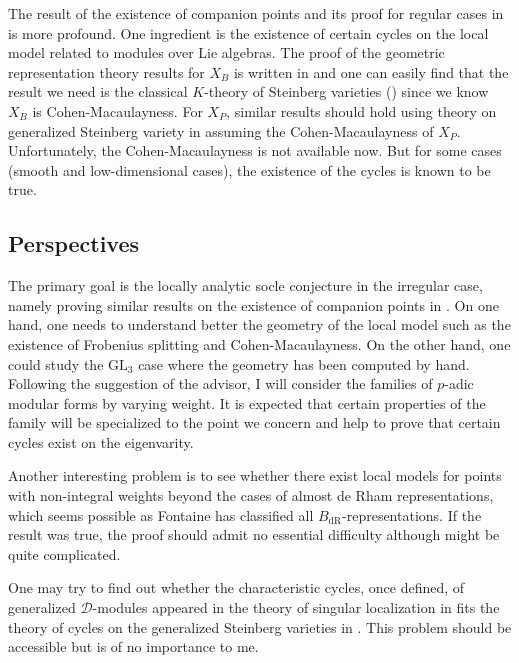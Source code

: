 \documentclass{amsart}
\newcommand{\GL}{\text{GL}}
\numberwithin{equation}{section}
\begin{document}
The result of the existence of companion points and its proof for regular cases in \cite{breuil2019local} is more profound. One ingredient is the existence of certain cycles on the local model related to modules over Lie algebras. The proof of the geometric representation theory results for $X_B$ is written in \cite{riche2008geometric} and one can easily find that the result we need is the classical $K$-theory of Steinberg varieties (\cite{Chriss1997RepresentationTA}) since we know $X_B$ is Cohen-Macaulayness. For $X_P$, similar results should hold using theory on generalized Steinberg variety in \cite{douglass2014equivariant} assuming the Cohen-Macaulayness of $X_P$. Unfortunately, the Cohen-Macaulayness is not available now. But for some cases (smooth and low-dimensional cases), the existence of the cycles is known to be true.
\subsection{Perspectives}
The primary goal is the locally analytic socle conjecture in the irregular case, namely proving similar results on the existence of companion points in \cite{breuil2019local}. On one hand, one needs to understand better the geometry of the local model such as the existence of Frobenius splitting and Cohen-Macaulayness. On the other hand, one could study the $\GL_3$ case where the geometry has been computed by hand. Following the suggestion of the advisor, I will consider the families of $p$-adic modular forms by varying weight. It is expected that certain properties of the family will be specialized to the point we concern and help to prove that certain cycles exist on the eigenvarity.\par
Another interesting problem is to see whether there exist local models for points with non-integral weights beyond the cases of almost de Rham representations, which seems possible as Fontaine has classified all $B_{\text{dR}}$-representations. If the result was true, the proof should admit no essential difficulty although might be quite complicated.\par
One may try to find out whether the characteristic cycles, once defined, of generalized $\mathcal{D}$-modules appeared in the theory of singular localization in \cite{Backelin2015singular} fits the theory of cycles on the generalized Steinberg varieties in \cite{douglass2014equivariant}. This problem should be accessible but is of no importance to me.


\end{document}
